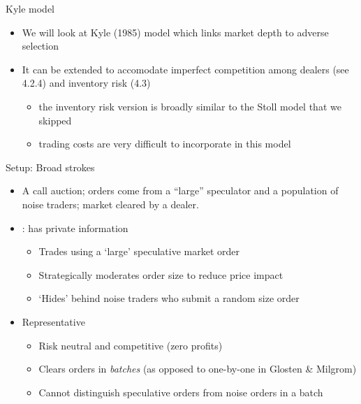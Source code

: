 \documentclass[english,10pt
,aspectratio=169
]{beamer}
\begin{document}
\begin{frame}{Kyle model}
	\begin{itemize}
		\item We will look at Kyle (1985) model which links market depth to adverse selection
		\item It can be extended to accomodate imperfect competition among dealers (see 4.2.4) and inventory risk (4.3)
		\begin{itemize}
			\item the inventory risk version is broadly similar to the Stoll model that we skipped
			\item trading costs are very difficult to incorporate in this model
		\end{itemize}
	\end{itemize}
\end{frame}


\begin{frame}{Setup: Broad strokes}
	\begin{itemize}
		\item A \alert{call auction}; orders come from a ``large'' speculator and a population of noise traders; market cleared by a dealer.
		\item {}: has private information
		\begin{itemize}
			\item Trades using a `large' speculative market order
			\item Strategically moderates order size to reduce price impact
			\item `Hides' behind noise traders who submit a random size order
		\end{itemize}
		\item Representative 
		\begin{itemize}
			\item Risk neutral and competitive (zero profits)
			\item Clears orders in \textit{batches} (as opposed to one-by-one in Glosten \& Milgrom)
			\item Cannot distinguish speculative orders from noise orders in a batch
		\end{itemize}
	\end{itemize}
\end{frame}
\end{document}
